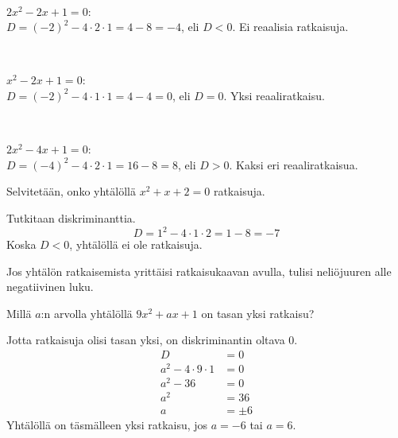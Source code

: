 \begin{esimerkki}
\ \\
\parbox{4.5cm}{
\begin{kuvaajapohja}{1}{-1}{3}{-1}{3}
\end{kuvaajapohja}
}
\parbox{6cm}{$2x^2-2x+1=0$:\\$D=(-2)^2-4 \cdot 2 \cdot 1=4-8=-4$, eli $D <0$. Ei reaalisia ratkaisuja.}
\\
\parbox{4.5cm}{
\begin{kuvaajapohja}{1}{-1}{3}{-1}{3}
\end{kuvaajapohja}
}
\parbox{6cm}{$x^2-2x+1=0$:\\$D=(-2)^2-4 \cdot 1 \cdot 1=4-4=0$, eli $D = 0$. Yksi reaaliratkaisu.}
\\
\parbox{4.5cm}{
\begin{kuvaajapohja}{1}{-1}{3}{-2}{2}
\end{kuvaajapohja}
}
\parbox{6cm}{$2x^2-4x+1=0$:\\$D=(-4)^2-4 \cdot 2 \cdot 1=16-8=8$, eli $D > 0$. Kaksi eri reaaliratkaisua.}
\end{esimerkki}

\begin{esimerkki}
Selvitetään, onko yhtälöllä $x^2+x+2=0$ ratkaisuja.

Tutkitaan diskriminanttia.
\[D=1^2-4\cdot 1 \cdot 2 = 1-8 = -7\]
Koska $D<0$, yhtälöllä ei ole ratkaisuja.

Jos yhtälön ratkaisemista yrittäisi ratkaisukaavan avulla, tulisi
neliöjuuren alle negatiivinen luku.
\end{esimerkki}

\begin{esimerkki}
Millä $a$:n arvolla yhtälöllä $9x^2+ax+1$ on tasan yksi ratkaisu?

Jotta ratkaisuja olisi tasan yksi, on diskriminantin oltava 0.
\begin{align*}
D &= 0\\
a^2-4\cdot 9\cdot 1 &= 0\\
a^2-36 &= 0\\
a^2 &= 36\\
a &= \pm 6
\end{align*}
Yhtälöllä on täsmälleen yksi ratkaisu, jos $a=-6$ tai $a=6$.
\end{esimerkki}

